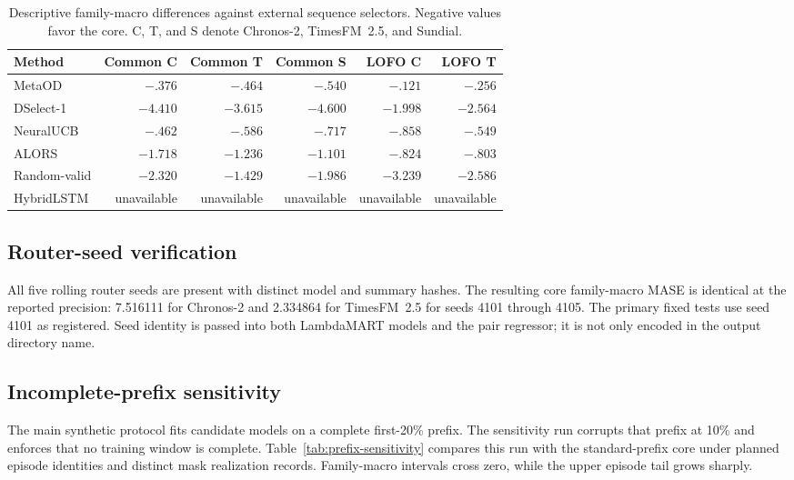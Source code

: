 \begin{table}[h]
\caption{Descriptive family-macro differences against external sequence selectors. Negative values favor the \bfais core. C, T, and S denote Chronos-2, TimesFM~2.5, and Sundial.}
\label{tab:external-descriptive}
\centering
\small
\setlength{\tabcolsep}{4.1pt}
\begin{tabular}{lrrrrr}
\toprule
Method & Common C & Common T & Common S & LOFO C & LOFO T \\
\midrule
MetaOD & $-.376$ & $-.464$ & $-.540$ & $-.121$ & $-.256$ \\
DSelect-1 & $-4.410$ & $-3.615$ & $-4.600$ & $-1.998$ & $-2.564$ \\
NeuralUCB & $-.462$ & $-.586$ & $-.717$ & $-.858$ & $-.549$ \\
ALORS & $-1.718$ & $-1.236$ & $-1.101$ & $-.824$ & $-.803$ \\
Random-valid & $-2.320$ & $-1.429$ & $-1.986$ & $-3.239$ & $-2.586$ \\
HybridLSTM & unavailable & unavailable & unavailable & unavailable & unavailable \\
\bottomrule
\end{tabular}
\end{table}

\subsection{Router-seed verification}

All five rolling router seeds are present with distinct model and summary hashes. The resulting core family-macro MASE is identical at the reported precision: 7.516111 for Chronos-2 and 2.334864 for TimesFM~2.5 for seeds 4101 through 4105. The primary fixed tests use seed 4101 as registered. Seed identity is passed into both LambdaMART models and the pair regressor; it is not only encoded in the output directory name.

\subsection{Incomplete-prefix sensitivity}

The main synthetic protocol fits candidate models on a complete first-20\% prefix. The sensitivity run corrupts that prefix at 10\% and enforces that no training window is complete. Table~\ref{tab:prefix-sensitivity} compares this run with the standard-prefix core under planned episode identities and distinct mask realization records. Family-macro intervals cross zero, while the upper episode tail grows sharply.

